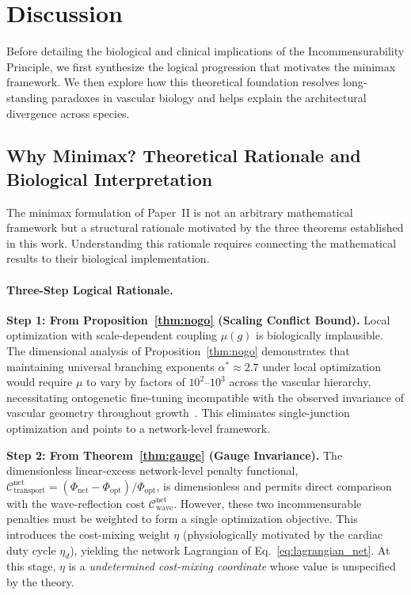 
\section{Discussion}

Before detailing the biological and clinical implications of the
Incommensurability Principle, we first synthesize the logical progression that
motivates the minimax framework. We then explore how this theoretical
foundation resolves long-standing paradoxes in vascular biology and helps
explain the architectural divergence across species.

\subsection{Why Minimax? Theoretical Rationale and Biological Interpretation}

The minimax formulation of Paper~II is not an arbitrary mathematical framework
but a structural rationale motivated by the three theorems established in
this work. Understanding this rationale requires connecting the
mathematical results to their biological implementation.

\paragraph{Three-Step Logical Rationale.}

\textbf{Step 1: From Proposition~\ref{thm:nogo} (Scaling Conflict Bound).} Local
optimization with scale-dependent coupling $\mu(g)$ is biologically implausible.
The dimensional analysis of Proposition~\ref{thm:nogo} demonstrates that
maintaining universal branching exponents $\alpha^* \approx 2.7$ under local
optimization would require $\mu$ to vary by factors of $10^2$--$10^3$ across the
vascular hierarchy, necessitating ontogenetic fine-tuning incompatible with the
observed invariance of vascular geometry throughout
growth~\cite{kassab1993,huang1996}. This eliminates single-junction optimization
and points to a network-level framework.

\textbf{Step 2: From Theorem~\ref{thm:gauge} (Gauge Invariance).} The
dimensionless linear-excess network-level penalty functional,
$\mathcal{C}_{\mathrm{transport}}^\mathrm{net} = (\Phi_{\mathrm{net}} -
\Phi_{\mathrm{opt}})/\Phi_{\mathrm{opt}}$, is dimensionless and permits direct
comparison with the wave-reflection cost
$\mathcal{C}_{\mathrm{wave}}^\mathrm{net}$. However, these two incommensurable
penalties must be weighted to form a single optimization objective. This
introduces the cost-mixing weight $\eta$ (physiologically motivated by the
cardiac duty cycle $\eta_d$), yielding the network Lagrangian of
Eq.~\eqref{eq:lagrangian_net}. At this stage, $\eta$ is a
\emph{undetermined cost-mixing coordinate} whose value is unspecified by
the theory.

